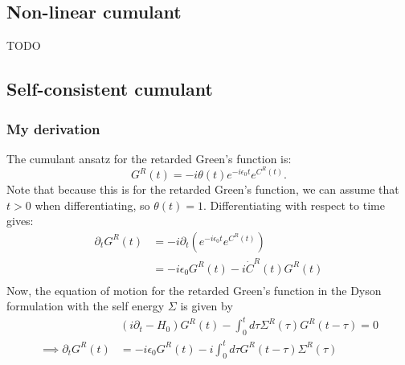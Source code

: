 \subsection{Non-linear cumulant}
TODO
\subsection{Self-consistent cumulant}

\subsubsection{My derivation}
 The cumulant ansatz for the retarded Green's function is:
\begin{equation}
    G^R(t)=-i \theta(t) e^{-i \epsilon_0 t} e^{C^R(t)} .
\end{equation}
Note that because this is for the retarded Green's function, we can assume that $t>0$ when differentiating, so $\theta(t)=1$. 
Differentiating with respect to time gives:
\begin{align}
    \partial_t G^R(t)&=-i\partial_t\left(e^{-i \epsilon_0 t} e^{C^R(t)}\right)\\
    &= -i \epsilon_0 G^R(t) - i \dot{C}^R(t) G^R(t)\\
\end{align}
 Now, the equation of motion for the retarded Green's function in the Dyson formulation with the self energy $\Sigma$ is given by
\begin{align}
&\left(i \partial_t-H_0\right) G^R(t)-\int_0^t d \tau \Sigma^R(\tau) G^R(t-\tau)=0\\
\implies \partial_t G^R(t)&=-i \epsilon _0 G^R(t)-i \int_0^t d \tau G^R(t-\tau) \Sigma^R(\tau)
\end{align}
